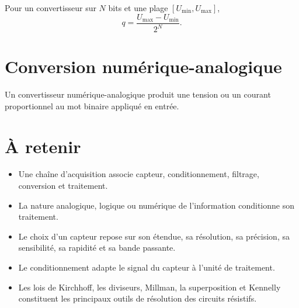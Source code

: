 Pour un convertisseur sur $N$ bits et une plage $[U_{\min},U_{\max}]$,
\[
q=\frac{U_{\max}-U_{\min}}{2^N}.
\]

\section{Conversion numérique-analogique}\label{sec:elec-cna}

Un convertisseur numérique-analogique produit une tension ou un courant proportionnel au mot binaire appliqué en entrée.

\section{À retenir}\label{sec:elec-retenir}

\begin{itemize}
  \item Une chaîne d'acquisition associe capteur, conditionnement, filtrage, conversion et traitement.
  \item La nature analogique, logique ou numérique de l'information conditionne son traitement.
  \item Le choix d'un capteur repose sur son étendue, sa résolution, sa précision, sa sensibilité, sa rapidité et sa bande passante.
  \item Le conditionnement adapte le signal du capteur à l'unité de traitement.
  \item Les lois de Kirchhoff, les diviseurs, Millman, la superposition et Kennelly constituent les principaux outils de résolution des circuits résistifs.
\end{itemize}
